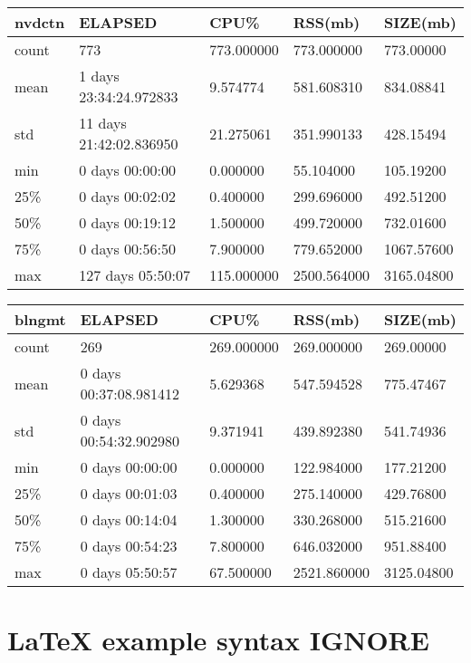 \documentclass{article}
\begin{document}
\begin{tabular}{|l|l|l|l|l|}
\hline 
\hline nvdctn&    ELAPSED&   CPU\%&  RSS(mb)&   SIZE(mb) \\
\hline count&   773& 773.000000&  773.000000&  773.00000 \\
\hline mean&  1 days 23:34:24.972833&  9.574774&  581.608310&  834.08841 \\
\hline std&  11 days 21:42:02.836950&  21.275061&  351.990133&  428.15494 \\
\hline min&   0 days 00:00:00&  0.000000&  55.104000&  105.19200 \\
\hline 25\%&   0 days 00:02:02&  0.400000&  299.696000&  492.51200 \\
\hline 50\%&   0 days 00:19:12&  1.500000&  499.720000&  732.01600 \\
\hline 75\%&   0 days 00:56:50&  7.900000&  779.652000& 1067.57600 \\
\hline max&  127 days 05:50:07& 115.000000& 2500.564000& 3165.04800 \\
\hline 
\end{tabular}
 
\begin{tabular}{|l|l|l|l|l|}
\hline 
\hline blngmt& ELAPSED&   CPU\%&  RSS(mb)&   SIZE(mb) \\
\hline count&    269& 269.000000&  269.000000&  269.00000 \\
\hline mean&  0 days 00:37:08.981412&  5.629368&  547.594528&  775.47467 \\
\hline std&  0 days 00:54:32.902980&  9.371941&  439.892380&  541.74936 \\
\hline min&   0 days 00:00:00&  0.000000&  122.984000&  177.21200 \\
\hline 25\%&   0 days 00:01:03&  0.400000&  275.140000&  429.76800 \\
\hline 50\%&   0 days 00:14:04&  1.300000&  330.268000&  515.21600 \\
\hline 75\%&   0 days 00:54:23&  7.800000&  646.032000&  951.88400 \\
\hline max&   0 days 05:50:57&  67.500000& 2521.860000& 3125.04800 \\
\hline 
\end{tabular}



\section{LaTeX example syntax IGNORE}
\end{document}

